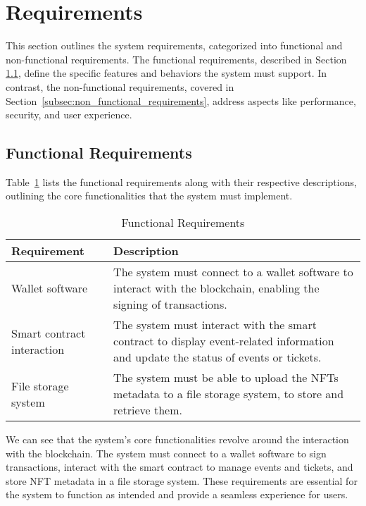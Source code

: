 \section{Requirements}
\label{sec:requirements}

This section outlines the system requirements, categorized into functional and
non-functional requirements. The functional requirements, described in Section
\ref{subsec:functional_requirements}, define the specific features and
behaviors the system must support. In contrast, the non-functional
requirements, covered in Section~\ref{subsec:non_functional_requirements},
address aspects like performance, security, and user experience.

\subsection{Functional Requirements}
\label{subsec:functional_requirements}

Table~\ref{tab:functional_requirements} lists the functional requirements along
with their respective descriptions, outlining the core functionalities that the
system must implement.

\begin{table}[H]
    \caption{Functional Requirements}
    \centering
    \begin{tabularx}{\textwidth}{lX}
        \hline
        \textbf{Requirement}       & \textbf{Description}                                                                                                              \\
        \hline
        Wallet software            & The system must connect to a wallet software to interact with the blockchain, enabling the signing of transactions.               \\
        \hline
        Smart contract interaction & The system must interact with the smart contract to display event-related information and update the status of events or tickets. \\
        \hline
        File storage system        & The system must be able to upload the NFTs metadata to a file storage system, to store and retrieve them.                         \\
        \hline
    \end{tabularx}
    \label{tab:functional_requirements}
\end{table}

We can see that the system's core functionalities revolve around the
interaction with the blockchain. The system must connect to a wallet software
to sign transactions, interact with the smart contract to manage events and
tickets, and store NFT metadata in a file storage system. These requirements
are essential for the system to function as intended and provide a seamless
experience for users.


